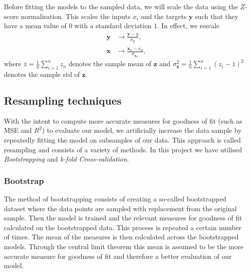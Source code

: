 \documentclass[twocolumn,english,notitlepage]{article}
\renewcommand{\vec}[1]{\boldsymbol{#1}}
\begin{document}
        Before fitting the models to the sampled data, we will scale the data using the $Z$-score normalisation. This scales the inputs $x_i$ and the targets $\vec{y}$ such that they have a mean value of $0$ with a standard deviation $1$. In effect, we rescale
        \begin{subequations}
            \begin{align}
                \vec{y} &\to \frac{\vec{y}-\bar{y}}{\bar{\sigma}_{\vec{y}}}, \\
                \vec{x} &\to \frac{\vec{x}_a - \bar{x}_a}{\bar{\sigma}_{\vec{x}_a}},
            \end{align}
        \end{subequations}
        where $\bar{z} = \frac{1}{n} \sum_{i=1}^n z_n$ denotes the sample mean of $\vec{z}$ and $\sigma_{\vec{z}}^2 = \frac{1}{n} \sum_{i=1}^n {(z_i-\bar{z})}^2$ denotes the sample std of $\vec{z}$.

    \subsection{Resampling techniques}
    With the intent to compute more accurate measures for goodness of fit (such as MSE and $R^2$) to evaluate our model, we 
    artificially increase the data sample by repeatedly fitting the model on subsamples of our data. This approach is called resampling and consists of a variety of methods. In this project we have utilised \textit{Bootstrapping} and \textit{k-fold Cross-validation}. 

        \subsubsection*{Bootstrap}
        The method of bootstrapping consists of creating a so-called bootstrapped dataset where the data points are sampled with replacement from the original sample. Then the model is trained and the relevant measures for goodness of fit calculated on the bootstrapped data. This process is repeated a certain number of times. The mean of the measures is then calculated across the bootstrapped models. Through the central limit theorem this mean is assumed to be the more accurate measure for goodness of fit and therefore a better evaluation of our model.  
\end{document}
